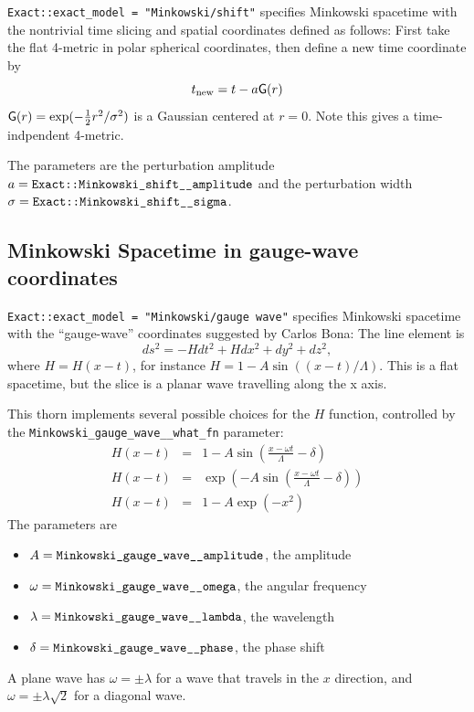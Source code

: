 \verb|Exact::exact_model = "Minkowski/shift"| specifies Minkowski spacetime
with the nontrivial time slicing and spatial coordinates defined as
follows:  First take the flat 4-metric in polar spherical coordinates,
then define a new time coordinate by
\begin{equation}
t_\text{new} = t - a {\sf G}(r)
\end{equation}
${\sf G}(r) = \exp(-{\textstyle \frac{1}{2}} r^2/\sigma^2)$ is a Gaussian centered at $r=0$.
Note this gives a time-indpendent 4-metric.

The parameters are the perturbation amplitude
$a = \verb|Exact::Minkowski_shift__amplitude|$
and the perturbation width $\sigma = \verb|Exact::Minkowski_shift__sigma|$.


\subsection{Minkowski Spacetime in gauge-wave coordinates}

\verb|Exact::exact_model = "Minkowski/gauge wave"| specifies Minkowski
spacetime with the ``gauge-wave'' coordinates suggested by Carlos Bona:
The line element is
\begin{equation}
ds^2=-H dt^2 +Hdx^2+dy^2+dz^2,
\end{equation}
where $H=H(x-t)$, for instance $H=1-A\sin\left((x-t)/\Lambda\right)$.
This is a flat spacetime, but the slice is a planar wave travelling
along the x axis.

This thorn implements several possible choices for the $H$ function,
controlled by the \verb|Minkowski_gauge_wave__what_fn| parameter:
\begin{eqnarray}
H(x-t)	&=& 1 - A \sin \left(\frac{x-\omega t}{\Lambda} - \delta\right)	\\
H(x-t)	&=& \exp \left(- A \sin \left(\frac{x-\omega t}{\Lambda}
                                      - \delta\right)\right)		\\
H(x-t)	&=& 1 - A \exp(-x^2)						%
\end{eqnarray}
The parameters are
\begin{itemize}
\item	$A = \verb|Minkowski_gauge_wave__amplitude|$, the amplitude
\item	$\omega = \verb|Minkowski_gauge_wave__omega|$, the angular frequency
\item	$\lambda = \verb|Minkowski_gauge_wave__lambda|$, the wavelength
\item	$\delta = \verb|Minkowski_gauge_wave__phase|$, the phase shift
\end{itemize}
A plane wave has $\omega = \pm \lambda$ for a wave that travels in the
$x$ direction, and $\omega = \pm \lambda \sqrt{2}$ for a diagonal wave.


